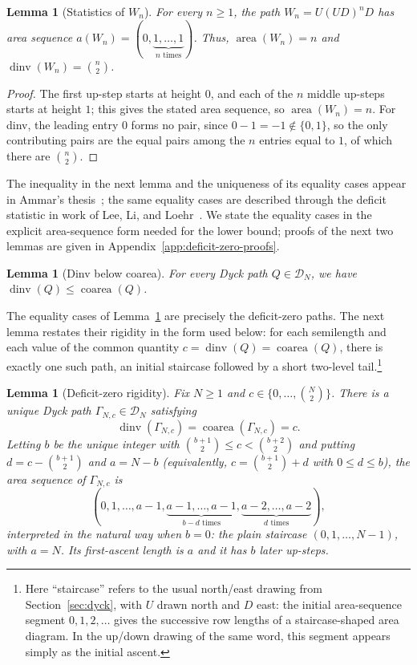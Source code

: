 \documentclass[11pt]{article}
\newtheorem{lemma}[theorem]{Lemma}
\theoremstyle{definition}
\newcommand{\D}{\mathcal D}
\newcommand{\area}{\operatorname{area}}
\newcommand{\dinv}{\operatorname{dinv}}
\newcommand{\coarea}{\operatorname{coarea}}
\begin{document}
\begin{lemma}[Statistics of $W_n$]\label{lem:wrapped-flat-stats}
For every $n\ge1$, the path $W_n=U(UD)^nD$ has area sequence
$a(W_n)=(0,\underbrace{1,\ldots,1}_{n\text{ times}})$.  Thus,
$\area(W_n)=n$ and $\dinv(W_n)=\binom n2$.
\end{lemma}

\begin{proof}
The first up-step starts at height $0$, and each of the $n$ middle
up-steps starts at height $1$; this gives the stated area sequence, so
$\area(W_n)=n$.  For dinv, the leading entry $0$ forms no pair, since
$0-1=-1\notin\{0,1\}$, so the only contributing pairs are the equal pairs
among the $n$ entries equal to $1$, of which there are $\binom n2$.
\end{proof}

The inequality in the next lemma and the uniqueness of its equality cases
appear in Ammar's thesis~\cite[Lemma~4.13, Theorem~4.18, and
Remark~4.20]{Ammar2015}; the same equality cases are described through the
deficit statistic in work of Lee, Li, and Loehr~\cite[Lemma~2.10]{LeeLiLoehr2018}.
We state the equality cases in the explicit
area-sequence form needed for the lower bound; proofs of the next two lemmas
are given in Appendix~\ref{app:deficit-zero-proofs}.

\begin{lemma}[Dinv below coarea]\label{lem:dinv-coarea}
For every Dyck path $Q\in\D_N$, we have $\dinv(Q)\le\coarea(Q)$.
\end{lemma}

The equality cases of Lemma~\ref{lem:dinv-coarea} are precisely the
deficit-zero paths.  The next lemma restates their rigidity in the form used
below: for each semilength and each value of the common quantity
$c=\dinv(Q)=\coarea(Q)$, there is exactly one such path, an initial staircase
followed by a short two-level tail.\footnote{Here ``staircase'' refers to the
usual north/east drawing from Section~\ref{sec:dyck}, with $U$ drawn north and
$D$ east: the initial area-sequence segment $0,1,2,\ldots$ gives the successive
row lengths of a staircase-shaped area diagram.  In the up/down drawing of the
same word, this segment appears simply as the initial ascent.}

\begin{lemma}[Deficit-zero rigidity]\label{lem:deficit-zero-targets}
Fix $N\ge 1$ and $c\in\{0,\ldots,\binom N2\}$.  There is a unique Dyck path
$\Gamma_{N,c}\in\D_N$ satisfying
\[
   \dinv(\Gamma_{N,c})=\coarea(\Gamma_{N,c})=c.
\]
Letting $b$ be the unique integer with
$\binom{b+1}{2}\le c<\binom{b+2}{2}$ and putting $d=c-\binom{b+1}{2}$ and
$a=N-b$ (equivalently, $c=\binom{b+1}{2}+d$ with $0\le d\le b$), the area sequence
of $\Gamma_{N,c}$ is
\[
   (0,1,\ldots,a-1,
     \underbrace{a-1,\ldots,a-1}_{b-d\text{ times}},
     \underbrace{a-2,\ldots,a-2}_{d\text{ times}}),
\]
interpreted in the natural way when $b=0$: the plain staircase
$(0,1,\ldots,N-1)$, with $a=N$.  Its first-ascent length is $a$
and it has $b$ later up-steps.
\end{lemma}
\end{document}
